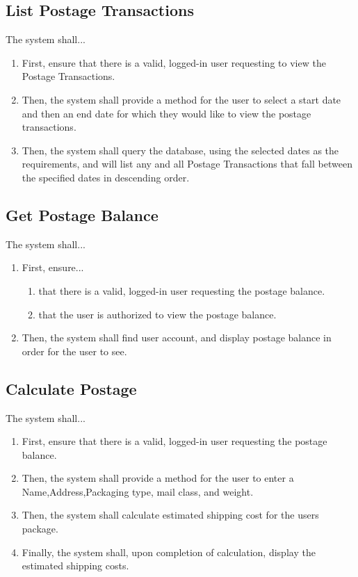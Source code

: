 \documentclass{scrreprt}
\begin{document}
\subsection{List Postage Transactions}

The system shall...

\begin{enumerate}
\item First, ensure that there is a valid, logged-in user requesting to view
the Postage Transactions.
\item Then, the system shall provide a method for the user to select a start
date and then an end date for which they would like to view the postage
transactions.
\item Then, the system shall query the database, using the selected dates as
the requirements, and will list any and all Postage Transactions that fall
between the specified dates in descending order.
\end{enumerate}

\subsection{Get Postage Balance}

The system shall...

\begin{enumerate}
\item First, ensure...
\begin{enumerate}
\item that there is a valid, logged-in user requesting the postage balance.
\item that the user is authorized to view the postage balance.
\end{enumerate}
\item Then, the system shall find user account, and display postage balance 
in order for the user to see.
\end{enumerate}

\subsection{Calculate Postage}

The system shall...

\begin{enumerate}
\item First, ensure that there is a valid, logged-in user requesting the
postage balance.  
\item Then, the system shall provide a method for the user to enter a
Name,Address,Packaging type, mail class, and weight.
\item Then, the system shall calculate estimated shipping cost for the users
package.
\item Finally, the system shall, upon completion of calculation, display the
estimated shipping costs.  
\end{enumerate}
\end{document}
